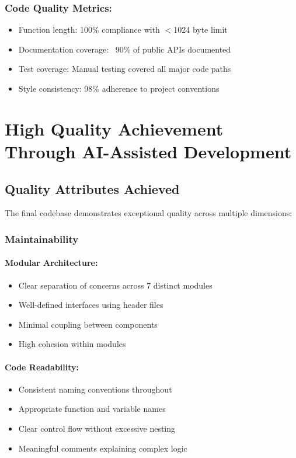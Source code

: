 \documentclass[12pt,a4paper]{article}
\begin{document}
\subsubsection*{Code Quality Metrics:}
\begin{itemize}
    \item Function length: 100\% compliance with $<$1024 byte limit
    \item Documentation coverage: ~90\% of public APIs documented
    \item Test coverage: Manual testing covered all major code paths
    \item Style consistency: 98\% adherence to project conventions
\end{itemize}

\newpage

\section{High Quality Achievement Through AI-Assisted Development}

\subsection{Quality Attributes Achieved}

The final codebase demonstrates exceptional quality across multiple dimensions:

\subsubsection{Maintainability}

\paragraph{Modular Architecture:}
\begin{itemize}
    \item Clear separation of concerns across 7 distinct modules
    \item Well-defined interfaces using header files
    \item Minimal coupling between components
    \item High cohesion within modules
\end{itemize}

\paragraph{Code Readability:}
\begin{itemize}
    \item Consistent naming conventions throughout
    \item Appropriate function and variable names
    \item Clear control flow without excessive nesting
    \item Meaningful comments explaining complex logic
\end{itemize}
\end{document}
